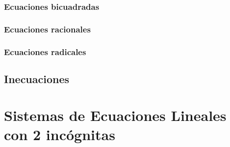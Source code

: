 \begin{ejer}

\end{ejer}

\begin{ejer}

\end{ejer}

\begin{ejer}

\end{ejer}

\subsubsection{Ecuaciones bicuadradas}

\subsubsection{Ecuaciones racionales}

\subsubsection{Ecuaciones radicales}

\subsection{Inecuaciones}

\begin{ejer}

\end{ejer}

\section{Sistemas de Ecuaciones Lineales con 2 incógnitas}





